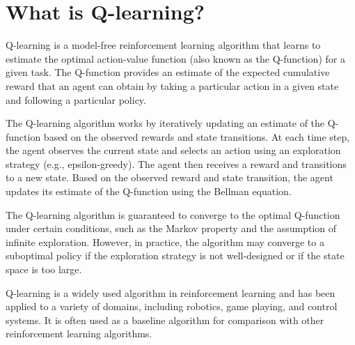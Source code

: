 \section{What is Q-learning?}
Q-learning is a model-free reinforcement learning algorithm that learns to estimate the optimal action-value function (also known as the Q-function) for a given task. The Q-function provides an estimate of the expected cumulative reward that an agent can obtain by taking a particular action in a given state and following a particular policy.

The Q-learning algorithm works by iteratively updating an estimate of the Q-function based on the observed rewards and state transitions. At each time step, the agent observes the current state and selects an action using an exploration strategy (e.g., epsilon-greedy). The agent then receives a reward and transitions to a new state. Based on the observed reward and state transition, the agent updates its estimate of the Q-function using the Bellman equation.

The Q-learning algorithm is guaranteed to converge to the optimal Q-function under certain conditions, such as the Markov property and the assumption of infinite exploration. However, in practice, the algorithm may converge to a suboptimal policy if the exploration strategy is not well-designed or if the state space is too large.

Q-learning is a widely used algorithm in reinforcement learning and has been applied to a variety of domains, including robotics, game playing, and control systems. It is often used as a baseline algorithm for comparison with other reinforcement learning algorithms.

